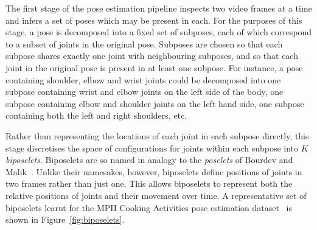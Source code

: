 \documentclass[runningheads]{llncs}
\begin{document}
The first stage of the pose estimation pipeline inspects two video frames at a
time and infers a set of poses which may be present in each. For the purposes of
this stage, a pose is decomposed into a fixed set of subposes, each of which
correspond to a subset of joints in the original pose. Subposes are chosen so
that each subpose shares exactly one joint with neighbouring subposes, and so
that each joint in the original pose is present in at least one subpose. For
instance, a pose containing shoulder, elbow and wrist joints could be decomposed
into one subpose containing wrist and elbow joints on the left side of the body,
one subpose containing elbow and shoulder joints on the left hand side, one
subpose containing both the left and right shoulders, etc.

Rather than representing the locations of each joint in each subpose directly,
this stage discretises the space of configurations for joints within each
subpose into $K$ \textit{biposelets}. Biposelets are so named in analogy to the
\textit{poselets} of Bourdev and Malik~\cite{bourdev2009poselets}. Unlike their
namesakes, however, biposelets define positions of joints in two frames rather
than just one. This allows biposelets to represent both the relative positions
of joints and their movement over time. A representative set of biposelets
learnt for the MPII Cooking Activities pose estimation
dataset~\cite{rohrbach2012database} is shown in Figure~\ref{fig:biposelets}.
\end{document}
